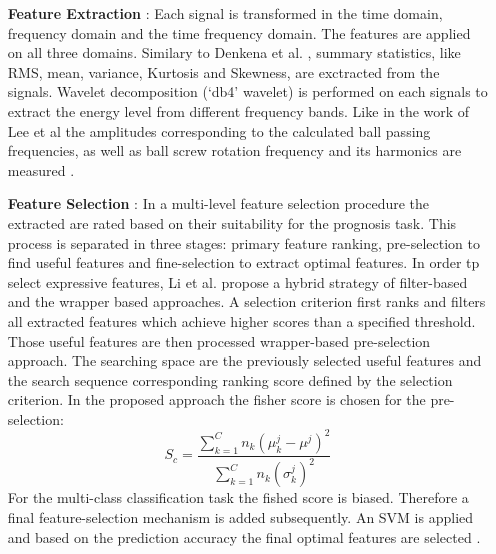 \begin{itemize}
    \item [\textbf{Feature Extraction}]: Each signal is transformed in the time domain, frequency domain and the time frequency domain. The features are applied on all three domains. Similary to Denkena et al. \cite{Denkena2021}, summary statistics, like RMS, mean, variance, Kurtosis and Skewness, are exctracted from the signals. Wavelet decomposition (‘db4’ wavelet) is performed on each signals to extract the energy level from different frequency bands. Like in the work of Lee et al \cite{Lee2015} the amplitudes corresponding to the calculated ball passing frequencies, as well as ball screw rotation frequency and its harmonics are measured \cite{LiPin2018}.
    \item [\textbf{Feature Selection}]: In a multi-level feature selection procedure the extracted are rated based on their suitability for the prognosis task. This process is separated in three stages: primary feature ranking, pre-selection to find useful features and fine-selection to extract optimal features. In order tp select expressive features, Li et al. \cite{LiPin2018} propose a hybrid strategy of filter-based and the wrapper based approaches. A selection criterion first ranks and filters all extracted features which achieve higher scores than a specified threshold. Those useful features are then processed wrapper-based pre-selection approach. The searching space are the previously selected useful features and the search sequence corresponding ranking score defined by the selection criterion. In the proposed approach the fisher score is chosen for the pre-selection:
    \begin{equation}
        S_{c} = \frac{\sum_{k=1}^{C} n_{k}(\mu_{k}^{j}-\mu^{j})^{2}}{\sum_{k=1}^{C}n_{k}(\sigma_{k}^{j})^{2}}
    \end{equation}
    For the multi-class classification task the fished score is biased. Therefore a final feature-selection mechanism is added subsequently. An SVM is applied and based on the prediction accuracy the final optimal features are selected \cite{LiPin2018}.
\end{itemize}

